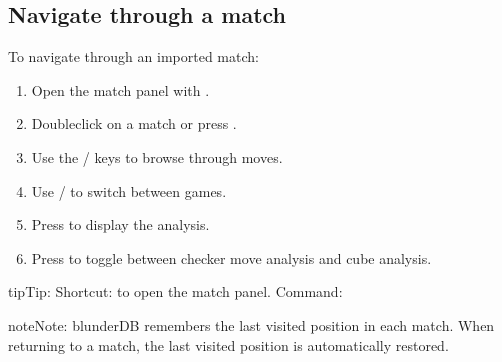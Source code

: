\documentclass[letterpaper,10pt,english]{sphinxmanual}
\begin{document}
\subsection{Navigate through a match}
\label{\detokenize{guide_utilisateur:naviguer-dans-un-match}}
\sphinxAtStartPar
To navigate through an imported match:
\begin{enumerate}
%
\item {} 
\sphinxAtStartPar
Open the match panel with .

\item {} 
\sphinxAtStartPar
Double\sphinxhyphen{}click on a match or press .

\item {} 
\sphinxAtStartPar
Use the  /  keys to browse through moves.

\item {} 
\sphinxAtStartPar
Use  /  to switch between games.

\item {} 
\sphinxAtStartPar
Press  to display the analysis.

\item {} 
\sphinxAtStartPar
Press  to toggle between checker move analysis and cube analysis.

\end{enumerate}

\begin{sphinxadmonition}{tip}{Tip:}
\sphinxAtStartPar
Shortcut:  to open the match panel. Command: 
\end{sphinxadmonition}

\begin{sphinxadmonition}{note}{Note:}
\sphinxAtStartPar
blunderDB remembers the last visited position in each match. When returning to a match, the last visited position is automatically restored.
\end{sphinxadmonition}
\end{document}
